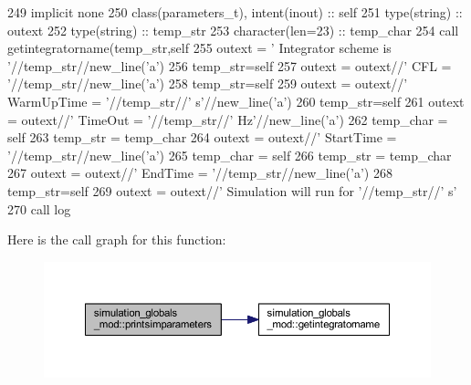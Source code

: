 \begin{DoxyCode}
249     \textcolor{keywordtype}{implicit none}
250     \textcolor{keywordtype}{class}(parameters\_t), \textcolor{keywordtype}{intent(inout)} :: self
251     \textcolor{keywordtype}{type}(string) :: outext
252     \textcolor{keywordtype}{type}(string) :: temp\_str
253     \textcolor{keywordtype}{character(len=23)} :: temp\_char
254     \textcolor{keyword}{call }getintegratorname(temp\_str,self%
255     outext = \textcolor{stringliteral}{'      Integrator scheme is '}//temp\_str//new\_line(\textcolor{stringliteral}{'a'})
256     temp\_str=self%
257     outext = outext//\textcolor{stringliteral}{'       CFL = '}//temp\_str//new\_line(\textcolor{stringliteral}{'a'})
258     temp\_str=self%
259     outext = outext//\textcolor{stringliteral}{'       WarmUpTime = '}//temp\_str//\textcolor{stringliteral}{' s'}//new\_line(\textcolor{stringliteral}{'a'})
260     temp\_str=self%
261     outext = outext//\textcolor{stringliteral}{'       TimeOut = '}//temp\_str//\textcolor{stringliteral}{' Hz'}//new\_line(\textcolor{stringliteral}{'a'})
262     temp\_char = self%
263     temp\_str = temp\_char
264     outext = outext//\textcolor{stringliteral}{'       StartTime = '}//temp\_str//new\_line(\textcolor{stringliteral}{'a'})
265     temp\_char = self%
266     temp\_str = temp\_char
267     outext = outext//\textcolor{stringliteral}{'       EndTime   = '}//temp\_str//new\_line(\textcolor{stringliteral}{'a'})
268     temp\_str=self%
269     outext = outext//\textcolor{stringliteral}{'       Simulation will run for '}//temp\_str//\textcolor{stringliteral}{' s'}
270     \textcolor{keyword}{call }log%
\end{DoxyCode}
Here is the call graph for this function\+:\nopagebreak
\begin{figure}[H]
\begin{center}
\leavevmode
\includegraphics[width=350pt]{namespacesimulation__globals__mod_a97c04d0289a9f2d004a9329cb7ab16f0_cgraph}
\end{center}
\end{figure}
\mbox{\label{namespacesimulation__globals__mod_aa65b43534d2d2b6366a4ebc791194805}} 
